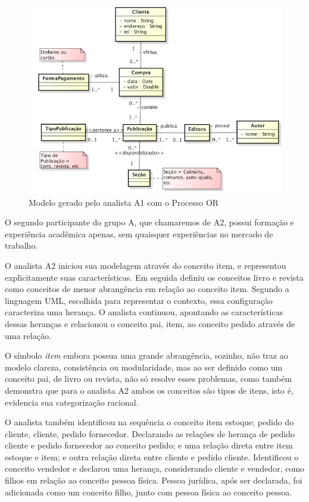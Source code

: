 \begin{figure}
    \centering
    \includegraphics[width=\textwidth]{imagens/Modelo_002_Aline_Macena.png}
    \caption{Modelo gerado pelo analista A1 com o Processo OR}
    \label{fig:modeloA1002}
\end{figure}

O segundo participante do grupo A, que chamaremos de A2, possui formação e experiência acadêmica apenas, sem quaisquer experiências no mercado de trabalho. 

O analista A2 iniciou sua modelagem através do conceito item, e representou explicitamente suas características. Em seguida definiu os conceitos livro e revista como conceitos de menor abrangência em relação ao conceito item. Segundo a linguagem UML, escolhida para representar o contexto, essa configuração caracteriza uma herança. O analista continuou, apontando as características dessas heranças e relacionou o conceito pai, item, ao conceito pedido através de uma relação. 

O símbolo \textit{item} embora possua uma grande abrangência, sozinho, não traz ao modelo clareza, consistência ou modularidade, mas ao ser definido como um conceito pai, de livro ou revista, não só resolve esses problemas, como também demonstra que para o analista A2 ambos os conceitos são tipos de itens, isto é, evidencia sua categorização racional. 

O analista também identificou na sequência o conceito item estoque; pedido do cliente, cliente, pedido fornecedor. Declarando as relações de herança de pedido cliente e pedido fornecedor ao conceito pedido; e uma relação direta entre item estoque e item; e outra relação direta entre cliente e pedido cliente. Identificou o conceito vendedor e declarou uma herança, considerando cliente e vendedor, como filhos em relação ao conceito pessoa física. Pessoa jurídica, após ser declarada, foi adicionada como um conceito filho, junto com pessoa física ao conceito pessoa.

